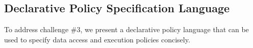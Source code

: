 

\subsection{Declarative Policy Specification Language}
\label{sec:policylanguage}

To address challenge \#3, we present a declarative policy language that can be used to specify data access and execution policies concisely. %

